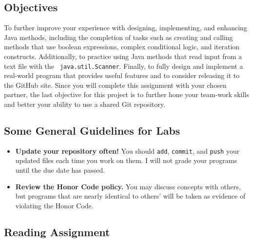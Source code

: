 



\vspace{-0.2in}
\subsection*{Objectives}
\vspace{-0.05in}

To further improve your experience with designing, implementing, and enhancing Java methods, including the completion of
tasks such as creating and calling methods that use boolean expressions, complex conditional logic, and iteration
constructs.  Additionally, to practice using Java methods that read input from a text file with the {\tt
java.util.Scanner}. Finally, to fully design and implement a real-world program that provides useful features and to
consider releasing it to the GitHub site. Since you will complete this assignment with your chosen partner, the last
objective for this project is to further hone your team-work skills and better your ability to use a shared Git
repository.

\vspace{-0.15in}
\subsection*{Some General Guidelines for Labs}
\vspace{-0.05in}

\begin{itemize}

\item {\bf Update your repository often!} You should {\tt add}, {\tt commit}, and {\tt push} your updated files each
  time you work on them.  I will not grade your programs until the due date has passed.

\item {\bf Review the Honor Code policy.} You may discuss concepts with others, but programs that are nearly identical
  to others' will be taken as evidence of violating the Honor Code.

\end{itemize}

\vspace{-0.25in}
\subsection*{Reading Assignment}
\vspace{-0.05in}

